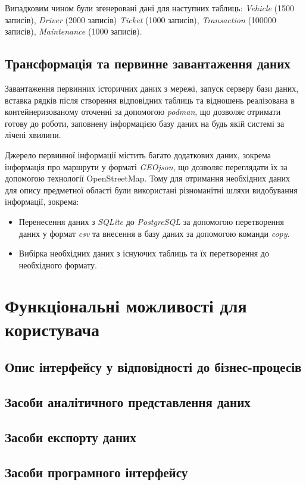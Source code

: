 \documentclass[oneside,14pt]{extarticle}
\begin{document}
Випадковим чином були згенеровані дані для наступних таблиць: \textit{Vehicle} (1500 записів), \textit{Driver} (2000 записів) \textit{Ticket} (1000 записів), \textit{Transaction} (100000 записів), \textit{Maintenance} (1000 записів).

\subsection{Трансформація та первинне завантаження даних}
Завантаження первинних історичних даних з мережі, запуск серверу бази даних, вставка рядків після створення відповідних таблиць та відношень реалізована в контейнеризованому оточенні за допомогою \textit{podman}, що дозволяє отримати готову до роботи, заповнену інформацією базу даних на будь якій системі за лічені хвилини.

Джерело первинної інформації містить багато додаткових даних, зокрема інформація про маршрути у форматі \textit{GEOjson}, що дозволяє переглядати їх за допомогою технології OpenStreetMap. Тому для отримання необхідних даних для опису предметної області були використані різноманітні шляхи видобування інформації, зокрема: 
\begin{itemize}
\item Перенесення даних з \textit{SQLite} до \textit{PostgreSQL} за допомогою перетворення даних у формат \textit{csv} та внесення в базу даних за допомогою команди \textit{copy}.
\item Вибірка необхідних даних з існуючих таблиць та їх перетворення до необхідного формату.
\end{itemize}

\newpage

\section{Функціональні можливості для користувача}
\subsection{Опис інтерфейсу у відповідності до бізнес-процесів}
\subsection{Засоби аналітичного представлення даних}
\subsection{Засоби експорту даних}
\subsection{Засоби програмного інтерфейсу}
\newpage
\end{document}
